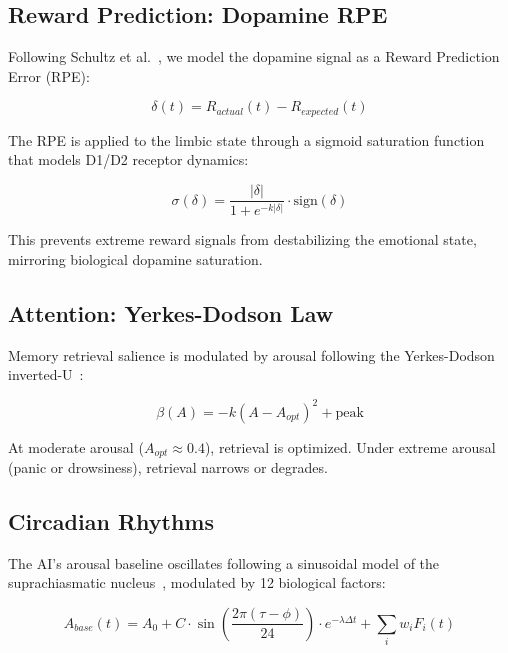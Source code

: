\documentclass[journal,twoside]{IEEEtran}
\begin{document}
\subsection{Reward Prediction: Dopamine RPE}

Following Schultz et al.~\cite{schultz1997, schultz2020}, we model the dopamine signal as a Reward Prediction Error (RPE):

\begin{equation}
\delta(t) = R_{actual}(t) - R_{expected}(t)
\label{eq:rpe}
\end{equation}

The RPE is applied to the limbic state through a sigmoid saturation function that models D1/D2 receptor dynamics:

\begin{equation}
\sigma(\delta) = \frac{|\delta|}{1 + e^{-k|\delta|}} \cdot \text{sign}(\delta)
\label{eq:sigmoid}
\end{equation}

This prevents extreme reward signals from destabilizing the emotional state, mirroring biological dopamine saturation.

\subsection{Attention: Yerkes-Dodson Law}

Memory retrieval salience is modulated by arousal following the Yerkes-Dodson inverted-U~\cite{yerkes1908, anderson2020}:

\begin{equation}
\beta(A) = -k(A - A_{opt})^2 + \text{peak}
\label{eq:yerkes}
\end{equation}

At moderate arousal ($A_{opt} \approx 0.4$), retrieval is optimized. Under extreme arousal (panic or drowsiness), retrieval narrows or degrades.

\subsection{Circadian Rhythms}

The AI's arousal baseline oscillates following a sinusoidal model of the suprachiasmatic nucleus~\cite{moore1972, meijer2021}, modulated by 12 biological factors:

\begin{equation}
A_{base}(t) = A_0 + C \cdot \sin\left(\frac{2\pi(\tau - \phi)}{24}\right) \cdot e^{-\lambda \Delta t} + \sum_{i} w_i F_i(t)
\label{eq:circadian}
\end{equation}
\end{document}
